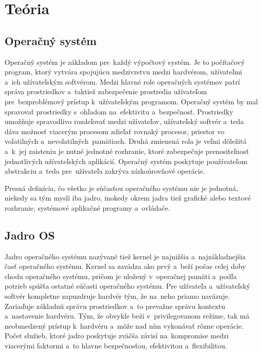 \chapter{Teória}
\label{teoria}
\section{Operačný systém} 
Operačný systém je základom pre~každý výpočtový systém. Je to počítačový program, ktorý vytvára spojujúcu medzivrstvu medzi hardvérom, užívateľmi a~ich užívateľským softvérom. Medzi hlavné role operačných systémov patrí správa prostriedkov a~taktiež zabezpečenie prostredia užívateľom pre~bezproblémový prístup k~užívateľským programom. Operačný systém by mal spravovať prostriedky s~ohľadom na~efektivitu a~bezpečnosť. Prostriedky umožňuje spravodlivo rozdeľovať medzi užívateľov, užívateľský softvér a~teda dáva možnosť viacerým procesom zdieľať rovnaký procesor, priestor vo volatilných a~nevolatilných~pamätiach. Druhá zmienená rola je veľmi dôležitá a~k~jej zaisteniu je nutné jednotné rozhranie, ktoré zabezpečuje prenositeľnosť jednotlivých užívateľských aplikácií. Operačný systém poskytuje používateľom abstrakciu a~teda pre~užívateľa zakrýva nízkoúrovňové operácie. \cite{ios}

Presná definícia, čo všetko je súčasťou operačného systému nie je jednotná, niekedy sa tým myslí iba jadro, inokedy okrem jadra tiež grafické alebo textové rozhranie, systémové aplikačné programy a~ovládače.
\section{Jadro OS}
Jadro operačného systému nazývané tiež kernel je najnižšia a~najzákladnejšia časť operačného systému. Kernel sa zavádza ako prvý a~beží počas celej doby chodu operačného systému, pričom je uložený v~operačnej pamäti a~podľa potrieb spúšťa ostatné súčasti operačného systému. Pre užívateľa a~užívateľský softvér kompletne zapuzdruje hardvér tým, že na~neho priamo naväzuje. Zariaďuje základnú správu prostriedkov a~to prevažne správu kontextu a~nastavenie hardvéru. Tým, že obvykle beží v~privilegovanom režime, tak má neobmedzený prístup k~hardvéru a~môže nad ním vykonávať rôzne operácie. Počet služieb, ktoré jadro poskytuje zväčša závisí na~kompromise medzi viacerými faktormi a~to hlavne bezpečnosťou, efektivitou a~flexibilitou. \cite{ios}
